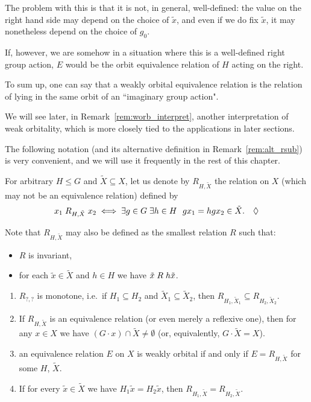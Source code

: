 	The problem with this is that it is not, in general, well-defined: the value on the right hand side may depend on the choice of $\tilde x$, and even if we do fix $\tilde x$, it may nonetheless depend on the choice of $g_0$.
	
	If, however, we are somehow in a situation where this is a well-defined right group action, $E$ would be the orbit equivalence relation of $H$ acting on the right.
	
	To sum up, one can say that a weakly orbital equivalence relation is the relation of lying in the same orbit of an ``imaginary group action".
	
	We will see later, in Remark~\ref{rem:worb_interpret}, another interpretation of weak orbitality, which is more closely tied to the applications in later sections.
	
	
	The following notation (and its alternative definition in Remark~\ref{rem:alt_rsub}) is very convenient, and we will use it frequently in the rest of this chapter.
	
	\begin{dfn}
		\label{dfn:rsub}
		For arbitrary $H\leq G$ and $\tilde X\subseteq X$, let us denote by $R_{H,\tilde X}$ the relation on $X$ (which may not be an equivalence relation) defined by
		\[
		x_1\Rr_{H,\tilde X} x_2\iff \exists g\in G \; \exists h\in H \ \ gx_1=hgx_2\in \tilde X.\xqed{\lozenge}
		\]
	\end{dfn}
	
	\begin{rem}
		\label{rem:alt_rsub}
		Note that $R_{H,\tilde X}$ may also be defined as the smallest relation $R$ such that:
		\begin{itemize}
			\item
			$R$ is invariant,
			\item
			for each $\tilde x\in \tilde X$ and $h\in H$ we have $\tilde x\mathrel{R} h\tilde x$. \xqed{\lozenge}
		\end{itemize}
	\end{rem}
	
	\begin{rem}\leavevmode
		\begin{enumerate}
			\item
			$R_{?,?}$ is monotone, i.e.\ if $H_1\subseteq H_2$ and $\tilde X_1\subseteq \tilde X_2$, then $R_{H_1,\tilde X_1}\subseteq R_{H_2,\tilde X_2}$.
			\item
			If $R_{H,\tilde X}$ is an equivalence relation (or even merely a reflexive one), then for any $x\in X$ we have $(G\cdot x)\cap \tilde X\neq \emptyset$ (or, equivalently, $G\cdot \tilde X=X$).
			\item
			an equivalence relation $E$ on $X$ is weakly orbital if and only if $E=R_{H,\tilde X}$ for some $H$, $\tilde X$.
			\item
			If for every $\tilde x\in \tilde X$ we have $H_1\tilde x=H_2\tilde x$, then $R_{H_1,\tilde X}=R_{H_2,\tilde X}$.\xqed{\lozenge}
		\end{enumerate}
	\end{rem}
	
